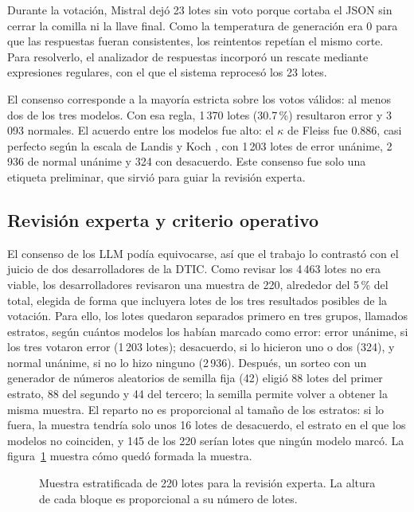 Durante la votación, Mistral dejó 23 lotes sin voto porque cortaba el JSON sin cerrar la comilla ni la llave final. Como la temperatura de generación era 0 para que las respuestas fueran consistentes, los reintentos repetían el mismo corte. Para resolverlo, el analizador de respuestas incorporó un rescate mediante expresiones regulares, con el que el sistema reprocesó los 23 lotes.

El consenso corresponde a la mayoría estricta sobre los votos válidos: al menos dos de los tres modelos. Con esa regla, 1\,370 lotes (30.7\,\%) resultaron error y 3\,093 normales. El acuerdo entre los modelos fue alto: el $\kappa$ de Fleiss \cite{fleiss1971_kappa} fue 0.886, casi perfecto según la escala de Landis y Koch \cite{landis1977_kappa}, con 1\,203 lotes de error unánime, 2\,936 de normal unánime y 324 con desacuerdo. Este consenso fue solo una etiqueta preliminar, que sirvió para guiar la revisión experta.

\subsection{Revisión experta y criterio operativo}\label{subsec:met_expertos}\label{sec:met_criterio}

El consenso de los LLM podía equivocarse, así que el trabajo lo contrastó con el juicio de dos desarrolladores de la DTIC. Como revisar los 4\,463 lotes no era viable, los desarrolladores revisaron una muestra de 220, alrededor del 5\,\% del total, elegida de forma que incluyera lotes de los tres resultados posibles de la votación. Para ello, los lotes quedaron separados primero en tres grupos, llamados estratos, según cuántos modelos los habían marcado como error: error unánime, si los tres votaron error (1\,203 lotes); desacuerdo, si lo hicieron uno o dos (324), y normal unánime, si no lo hizo ninguno (2\,936). Después, un sorteo con un generador de números aleatorios de semilla fija (42) eligió 88 lotes del primer estrato, 88 del segundo y 44 del tercero; la semilla permite volver a obtener la misma muestra. El reparto no es proporcional al tamaño de los estratos: si lo fuera, la muestra tendría solo unos 16 lotes de desacuerdo, el estrato en el que los modelos no coinciden, y 145 de los 220 serían lotes que ningún modelo marcó. La figura~\ref{fig:met_muestra} muestra cómo quedó formada la muestra.

\begin{figure}[H]
\centering

\caption{Muestra estratificada de 220 lotes para la revisión experta. La altura de cada bloque es proporcional a su número de lotes.}
\label{fig:met_muestra}
\end{figure}

